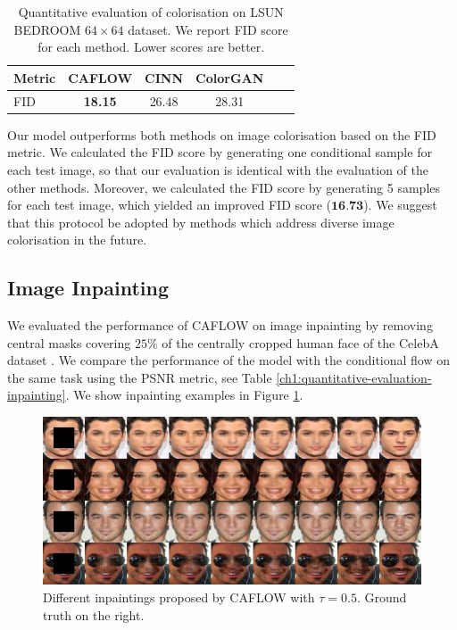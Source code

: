 \begin{table}[h!]
    \centering
    
    \caption{Quantitative evaluation of colorisation on LSUN BEDROOM $64\times 64$ dataset. We report FID score for each method. Lower scores are better. }
    \label{ch1:colorisation-comparison}
    \setlength{\tabcolsep}{3pt}
    
    \begin{tabular}{l|ccccc}
     Metric &    \textbf{CAFLOW} &   CINN \cite{ardizzone2019guided}     &   ColorGAN \cite{colorGAN}  \\
    
    \midrule
      FID &  \textbf{18.15} & 26.48 &  28.31 \\
    
    \end{tabular}
\end{table}

Our model outperforms both methods on image colorisation based on the FID metric. We calculated the FID score by generating one conditional sample for each test image, so that our evaluation is identical with the evaluation of the other methods. Moreover, we calculated the FID score by generating 5 samples for each test image, which yielded an improved FID score ($\textbf{16.73}$). We suggest that this protocol be adopted by methods which address diverse image colorisation in the future. 

\subsection{Image Inpainting}

We evaluated the performance of CAFLOW on image inpainting by removing central masks covering $25\%$ of the centrally cropped human face of the CelebA dataset \cite{liu2015deep}. We compare the performance of the model with the conditional flow \cite{cGLOW} on the same task using the PSNR metric, see Table \ref{ch1:quantitative-evaluation-inpainting}. We show inpainting examples in Figure \ref{ch1:qualitative-performance-inpainting}.

\begin{figure}[h!]
    \centering
    \includegraphics[width=.8\textwidth]{Chapter1/paper_graphs/inpainting/even_smaller_merged.jpg}
    \caption{Different inpaintings proposed by CAFLOW with $\tau=0.5$. Ground truth on the right.}
    \label{ch1:qualitative-performance-inpainting}
\end{figure}

